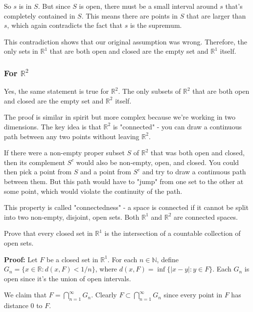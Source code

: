So $s$ is in $S$. But since $S$ is open, there must be a small interval around $s$ that's completely contained in $S$. This means there are points in $S$ that are larger than $s$, which again contradicts the fact that $s$ is the supremum.

This contradiction shows that our original assumption was wrong. Therefore, the only sets in $\mathbb{R}^1$ that are both open and closed are the empty set and $\mathbb{R}^1$ itself.

\subsubsection*{For $\mathbb{R}^2$}

Yes, the same statement is true for $\mathbb{R}^2$. The only subsets of $\mathbb{R}^2$ that are both open and closed are the empty set and $\mathbb{R}^2$ itself.

The proof is similar in spirit but more complex because we're working in two dimensions. The key idea is that $\mathbb{R}^2$ is "connected" - you can draw a continuous path between any two points without leaving $\mathbb{R}^2$.

If there were a non-empty proper subset $S$ of $\mathbb{R}^2$ that was both open and closed, then its complement $S^c$ would also be non-empty, open, and closed. You could then pick a point from $S$ and a point from $S^c$ and try to draw a continuous path between them. But this path would have to "jump" from one set to the other at some point, which would violate the continuity of the path.

This property is called "connectedness" - a space is connected if it cannot be split into two non-empty, disjoint, open sets. Both $\mathbb{R}^1$ and $\mathbb{R}^2$ are connected spaces.



\begin{problembox}
Prove that every closed set in $\mathbb{R}^1$ is the intersection of a countable collection of open sets.
\end{problembox}

\textbf{Proof:} Let $F$ be a closed set in $\mathbb{R}^1$. For each $n \in \mathbb{N}$, define $G_n = \{x \in \mathbb{R} : d(x,F) < 1/n\}$, where $d(x,F) = \inf\{|x-y| : y \in F\}$. Each $G_n$ is open since it's the union of open intervals.

We claim that $F = \bigcap_{n=1}^{\infty} G_n$. Clearly $F \subset \bigcap_{n=1}^{\infty} G_n$ since every point in $F$ has distance 0 to $F$.

